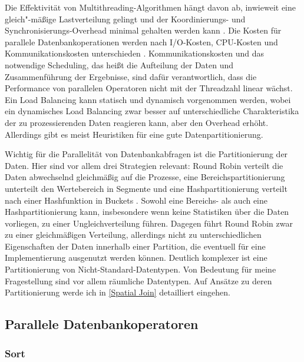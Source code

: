\documentclass[a4paper,12pt,twoside]{article}
\begin{document}
Die Effektivität von Multithreading-Algorithmen hängt davon ab, inwieweit eine gleich"-mäßige Lastverteilung gelingt und der Koordinierungs- und Synchronisierungs-Overhead minimal gehalten werden kann \parencite{Lakshmi1990}. Die Kosten für parallele Datenbankoperationen werden nach I/O-Kosten, CPU-Kosten und Kommunikationskosten unterschieden \parencite [S. 23]{Yu1998}. Kommunikationskosten und das notwendige Scheduling, das heißt die Aufteilung der Daten und Zusammenführung der Ergebnisse, sind dafür verantwortlich, dass die Performance von parallelen Operatoren nicht mit der Threadzahl linear wächst. Ein Load Balancing kann statisch und dynamisch vorgenommen werden, wobei ein dynamisches Load Balancing zwar besser auf unterschiedliche Charakteristika der zu prozessierenden Daten reagieren kann, aber den Overhead erhöht. Allerdings gibt es meist Heuristiken für eine gute Datenpartitionierung.

Wichtig für die Parallelität von Datenbankabfragen ist die Partitionierung der Daten. Hier sind vor allem drei Strategien relevant: Round Robin verteilt die Daten abwechselnd gleichmäßig auf die Prozesse, eine Bereichspartitionierung unterteilt den Wertebereich in Segmente und eine Hashpartitionierung verteilt nach einer Hashfunktion in Buckets \parencite{Yu1998}. Sowohl eine Bereichs- als auch eine Hashpartitionierung kann, insbesondere wenn keine Statistiken über die Daten vorliegen, zu einer Ungleichverteilung führen. Dagegen führt Round Robin zwar zu einer gleichmäßigen Verteilung, allerdings nicht zu unterschiedlichen Eigenschaften der Daten innerhalb einer Partition, die eventuell für eine Implementierung ausgenutzt werden können. Deutlich komplexer ist eine Partitionierung von Nicht-Standard-Datentypen. Von Bedeutung für meine Fragestellung sind vor allem räumliche Datentypen. Auf Ansätze zu deren Partitionierung werde ich in \autoref{Spatial Join} detailliert eingehen. 


\subsection{Parallele Datenbankoperatoren}

\subsubsection{Sort}
\label{Sort} 
\end{document}
